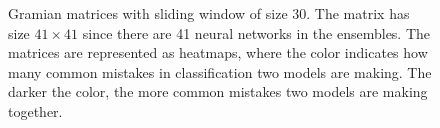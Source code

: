 \documentclass[conference]{IEEEtran}
\begin{document}
		\begin{figure}[H]
			\centering
			\caption{Gramian matrices with sliding window of size 30. The matrix has size $41 \times 41$ since there are 41 neural networks in the ensembles. The matrices are represented as heatmaps, where the color indicates how many common mistakes in classification two models are making. The darker the color, the more common mistakes two models are making together. }
			\label{fig:gram-L30}%
		\end{figure}
\end{document}
